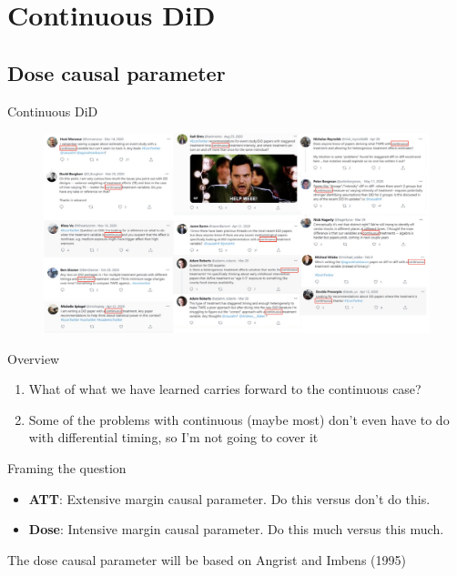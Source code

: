 \documentclass{beamer}
\begin{document}




\section{Continuous DiD}

\subsection{Dose causal parameter}

\begin{frame}{Continuous DiD}

\begin{figure}
\begin{center}
             \includegraphics[scale=0.4]{./lecture_includes/continuous_did_image}
\end{center}
\end{figure}

\end{frame}

\begin{frame}{Overview}

\begin{enumerate}
\item What of what we have learned carries forward to the continuous case?
\item Some of the problems with continuous (maybe most) don't even have to do with differential timing, so I'm not going to cover it
\end{enumerate}

\end{frame}

\begin{frame}{Framing the question}

\begin{itemize}
\item \textbf{ATT}: Extensive margin causal parameter.  Do this versus don't do this.
\item \textbf{Dose}: Intensive margin causal parameter.  Do this much versus this much.
\end{itemize}

\bigskip

The dose causal parameter will be based on Angrist and Imbens (1995)

\end{frame}
\end{document}
